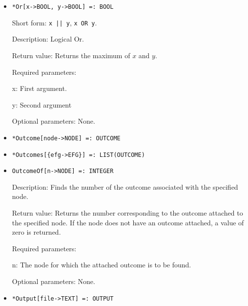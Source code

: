 \begin{itemize}
\ed
\ed


\item 
\protect \large \begin{verbatim}
*Or[x->BOOL, y->BOOL] =: BOOL
\end{verbatim} \normalsize
  
\bd
\item
[Short form:] \verb+x || y+, \verb+x OR y+.
\item
[Description:] Logical Or.
\item
[Return value:] Returns the maximum of $x$ and $y$.  
\item
[Required parameters:]\hfil\null
\bd
\item
[x:] First argument.  
\item
[y:] Second argument
\ed
\item
[Optional parameters:] None.
\ed

\item
\protect \large \begin{verbatim}
*Outcome[node->NODE] =: OUTCOME
\end{verbatim}\normalsize

\item
\protect \large \begin{verbatim}
*Outcomes[{efg->EFG}] =: LIST(OUTCOME)
\end{verbatim}\normalsize



\item
\protect \large \begin{verbatim}
OutcomeOf[n->NODE] =: INTEGER
\end{verbatim}\normalsize

\bd

\item
[Description:] Finds the number of the outcome associated with the
specified node.
\item
[Return value:] Returns the number corresponding to the outcome
attached to the specified node.  If the node does not have an outcome
attached, a value of zero is returned.
\item
[Required parameters:]\hfil\null
	
\bd
\item
[n:] The node for which the attached outcome is to be found.
\ed

\item
[Optional parameters:] None.
\ed

\item
\protect \large \begin{verbatim}
*Output[file->TEXT] =: OUTPUT
\end{verbatim}\normalsize



\end{itemize}
